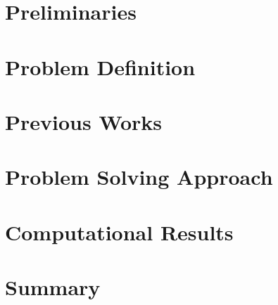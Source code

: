\documentclass[a4paper,11pt,twoside]{memoir}
\begin{document}
\chapter{Preliminaries}
\label{ch:prelim}


\chapter{Problem Definition}
\label{ch:problem}


\chapter{Previous Works}
\label{ch:previous}


\chapter{Problem Solving Approach}
\label{ch:approach}


\chapter{Computational Results}
\label{ch:typo}


%

\chapter{Summary}
\label{ch:summary}






\appendix



\end{document}
